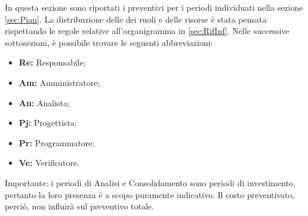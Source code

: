 In questa sezione sono riportati i preventivi per i periodi individuati nella sezione \cref{sec:Pian}. \newline
La distribuzione delle dei ruoli e delle risorse è stata pensata rispettando le regole relative all'organigramma in \cref{sec:RifInf}.\newline
Nelle successive sottosezioni, è possibile trovare le seguenti abbreviazioni:
\begin{itemize}
	\item \textbf{Re: }Responsabile;
	\item \textbf{Am: }Amministratore;
	\item \textbf{An: }Analista;
	\item \textbf{Pj: }Progettista;
	\item \textbf{Pr: }Programmatore;
	\item \textbf{Ve: }Verificatore.
\end{itemize}

\bigskip
\bigskip
Importante: i periodi di Analisi e Consolidamento sono {periodi di investimento}, pertanto la loro presenza è a scopo puramente indicativo. Il costo preventivato, perciò, non influirà sul preventivo totale.\newline